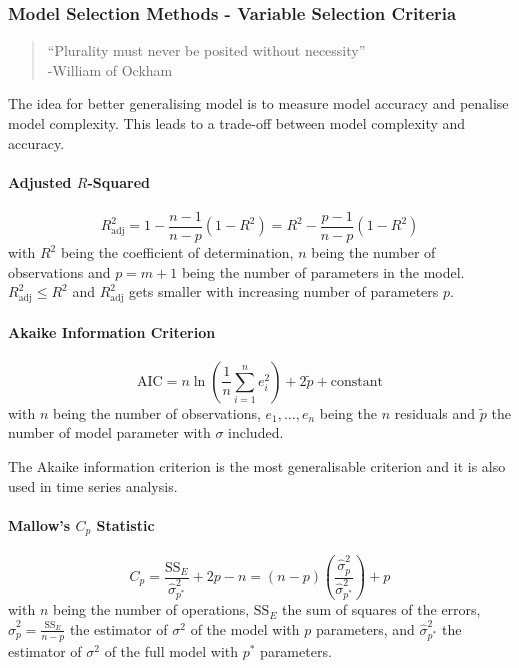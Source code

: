 \documentclass[11pt]{article}
\theoremstyle{definition}
\begin{document}
\subsubsection{Model Selection Methods - Variable Selection Criteria}
\begin{quote}
	\textquotedblleft Plurality must never be posited without necessity\textquotedblright\\
	\hspace*{2em} -William of Ockham
\end{quote}
The idea for better generalising model is to measure model accuracy and penalise model complexity. This leads to a trade-off between model complexity and accuracy.

\paragraph{Adjusted $R$-Squared}
\begin{equation*}
	R_{\text{adj}}^2 = 1 - \frac{n-1}{n-p}(1-R^2) = R^2 - \frac{p-1}{n-p}(1-R^2)
\end{equation*}
with $R^2$ being the coefficient of determination, $n$ being the number of observations and $p=m+1$ being the number of parameters in the model. $R_{\text{adj}}^2\leq R^2$ and $R_{\text{adj}}^2$ gets smaller with increasing number of parameters $p$.

\paragraph{Akaike Information Criterion}
\begin{equation*}
	\text{AIC} = n\ln\left(\frac{1}{n}\sum_{i=1}^{n}e_i^2\right) + 2\tilde{p} + \text{constant}
\end{equation*}
with $n$ being the number of observations, $e_1,\dots,e_n$ being the $n$ residuals and $\tilde{p}$ the number of model parameter with $\sigma$ included.

The Akaike information criterion is the most generalisable criterion and it is also used in time series analysis.

\paragraph{Mallow's $C_p$ Statistic}
\begin{equation*}
	C_p = \frac{\text{SS}_{E}}{\hat{\sigma}_{p^*}^2} + 2p - n = (n-p)\left(\frac{\hat{\sigma}_{p}^2}{\hat{\sigma}_{p^*}^2}\right) + p
\end{equation*}
with $n$ being the number of operations, $\text{SS}_E$ the sum of squares of the errors, $\hat{\sigma}_{p}^2 = \frac{\text{SS}_E}{n-p}$ the estimator of $\sigma^2$ of the model with $p$ parameters, and $\hat{\sigma}_{p^*}^2$ the estimator of $\sigma^2$ of the full model with $p^*$ parameters.
\end{document}
